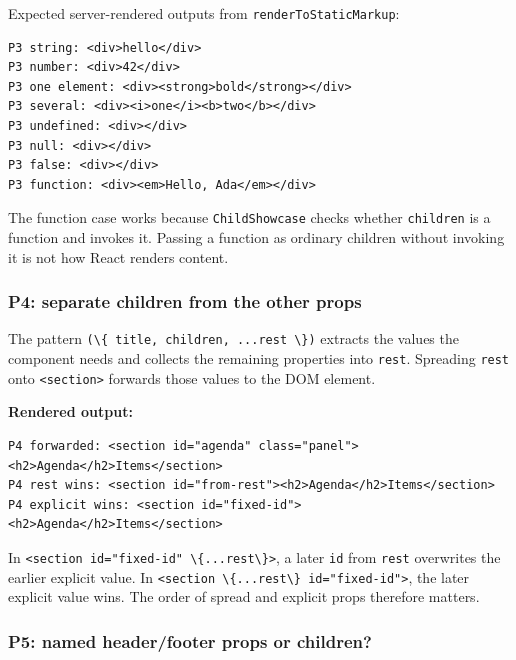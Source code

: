 \documentclass[
]{article}
\newcommand{\passthrough}[1]{#1}
\begin{document}
Expected server-rendered outputs from
\passthrough{\lstinline!renderToStaticMarkup!}:

\begin{lstlisting}
P3 string: <div>hello</div>
P3 number: <div>42</div>
P3 one element: <div><strong>bold</strong></div>
P3 several: <div><i>one</i><b>two</b></div>
P3 undefined: <div></div>
P3 null: <div></div>
P3 false: <div></div>
P3 function: <div><em>Hello, Ada</em></div>
\end{lstlisting}

The function case works because \passthrough{\lstinline!ChildShowcase!}
checks whether \passthrough{\lstinline!children!} is a function and
invokes it. Passing a function as ordinary children without invoking it
is not how React renders content.

\subsubsection{P4: separate children from the other
props}\label{p4-separate-children-from-the-other-props}

The pattern \passthrough{\lstinline!(\{ title, children, ...rest \})!}
extracts the values the component needs and collects the remaining
properties into \passthrough{\lstinline!rest!}. Spreading
\passthrough{\lstinline!rest!} onto \passthrough{\lstinline!<section>!}
forwards those values to the DOM element.

\textbf{Rendered output:}

\begin{lstlisting}
P4 forwarded: <section id="agenda" class="panel"><h2>Agenda</h2>Items</section>
P4 rest wins: <section id="from-rest"><h2>Agenda</h2>Items</section>
P4 explicit wins: <section id="fixed-id"><h2>Agenda</h2>Items</section>
\end{lstlisting}

In \passthrough{\lstinline!<section id="fixed-id" \{...rest\}>!}, a
later \passthrough{\lstinline!id!} from \passthrough{\lstinline!rest!}
overwrites the earlier explicit value. In
\passthrough{\lstinline!<section \{...rest\} id="fixed-id">!}, the later
explicit value wins. The order of spread and explicit props therefore
matters.

\subsubsection{P5: named header/footer props or
children?}\label{p5-named-headerfooter-props-or-children}
\end{document}
